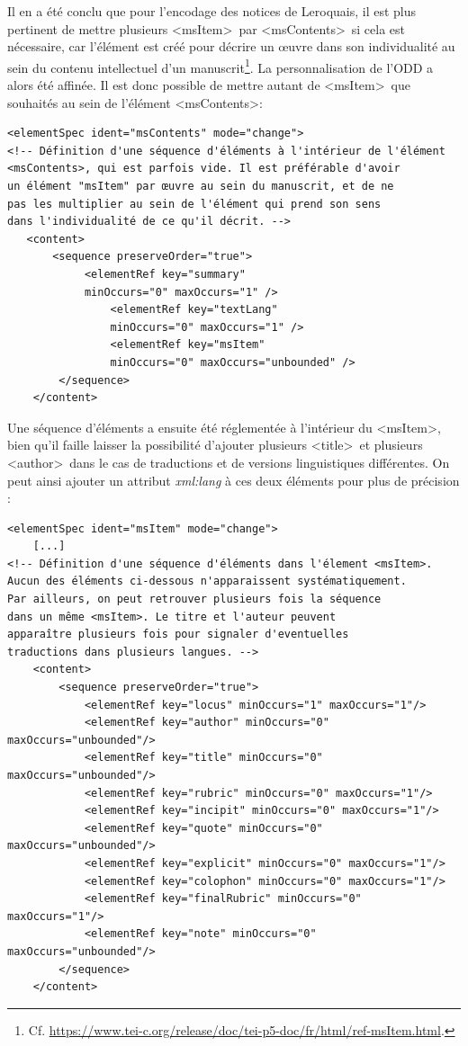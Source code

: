 \documentclass[a4paper,12pt,twoside]{book}
\begin{document}
Il en a été conclu que pour l'encodage des notices de Leroquais, il est plus pertinent de mettre plusieurs \textless msItem\textgreater~par \textless msContents\textgreater~si cela est nécessaire, car l’élément est créé pour décrire un œuvre dans son individualité au sein du contenu intellectuel d’un manuscrit\footnote{Cf. \url{https://www.tei-c.org/release/doc/tei-p5-doc/fr/html/ref-msItem.html}.}. La personnalisation de l'ODD a alors été affinée. Il est donc possible de mettre autant de \textless msItem\textgreater~que souhaités au sein de l'élément \textless msContents\textgreater :
\begin{verbatim}
<elementSpec ident="msContents" mode="change">
<!-- Définition d'une séquence d'éléments à l'intérieur de l'élément 
<msContents>, qui est parfois vide. Il est préférable d'avoir 
un élément "msItem" par œuvre au sein du manuscrit, et de ne 
pas les multiplier au sein de l'élément qui prend son sens 
dans l'individualité de ce qu'il décrit. -->
   <content>
       <sequence preserveOrder="true">
            <elementRef key="summary" 
            minOccurs="0" maxOccurs="1" />
                <elementRef key="textLang" 
                minOccurs="0" maxOccurs="1" />
                <elementRef key="msItem" 
                minOccurs="0" maxOccurs="unbounded" />            
        </sequence>
    </content>
\end{verbatim}
Une séquence d'éléments a ensuite été réglementée à l’intérieur du \textless msItem\textgreater, bien qu’il faille laisser la possibilité d'ajouter plusieurs \textless title\textgreater~et plusieurs \textless author\textgreater~dans le cas de traductions et de versions linguistiques différentes. On peut ainsi ajouter un attribut \textit{xml:lang} à ces deux éléments pour plus de précision :
\begin{verbatim}
<elementSpec ident="msItem" mode="change">
    [...]
<!-- Définition d'une séquence d'éléments dans l'élement <msItem>. 
Aucun des éléments ci-dessous n'apparaissent systématiquement. 
Par ailleurs, on peut retrouver plusieurs fois la séquence 
dans un même <msItem>. Le titre et l'auteur peuvent 
apparaître plusieurs fois pour signaler d'eventuelles 
traductions dans plusieurs langues. -->
    <content>
        <sequence preserveOrder="true">
            <elementRef key="locus" minOccurs="1" maxOccurs="1"/>
            <elementRef key="author" minOccurs="0" maxOccurs="unbounded"/>
            <elementRef key="title" minOccurs="0" maxOccurs="unbounded"/>
            <elementRef key="rubric" minOccurs="0" maxOccurs="1"/>
            <elementRef key="incipit" minOccurs="0" maxOccurs="1"/>
            <elementRef key="quote" minOccurs="0" maxOccurs="unbounded"/>
            <elementRef key="explicit" minOccurs="0" maxOccurs="1"/>
            <elementRef key="colophon" minOccurs="0" maxOccurs="1"/>
            <elementRef key="finalRubric" minOccurs="0" maxOccurs="1"/>
            <elementRef key="note" minOccurs="0" maxOccurs="unbounded"/>
        </sequence>
    </content>
\end{verbatim}
\end{document}
